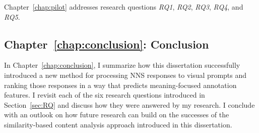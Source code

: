Chapter~\ref{chap:pilot} addresses research questions \textit{RQ1}, \textit{RQ2}, \textit{RQ3}, \textit{RQ4}, and \textit{RQ5}.


\subsection{Chapter~\ref{chap:conclusion}: Conclusion}
In Chapter~\ref{chap:conclusion}, I summarize how this dissertation successfully introduced a new method for processing NNS responses to visual prompts and ranking those responses in a way that predicts meaning-focused annotation features. I revisit each of the six research questions introduced in Section~\ref{sec:RQ} and discuss how they were answered by my research. I conclude with an outlook on how future research can build on the successes of the similarity-based content analysis approach introduced in this dissertation.


